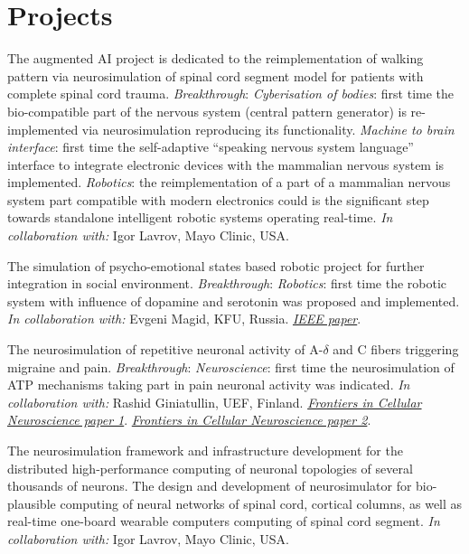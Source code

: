 \documentclass{moderncv}
\begin{document}
\section{Projects}

       {\small The augmented AI project is dedicated to the reimplementation of walking pattern via neurosimulation of spinal cord segment model for patients with complete spinal cord trauma.
  \emph{Breakthrough}:
  \emph{Cyberisation of bodies}: first time the bio-compatible part of the nervous system (central pattern generator) is re-implemented via neurosimulation reproducing its functionality.
  \emph{Machine to brain interface}: first time the self-adaptive ``speaking nervous system language'' interface to integrate electronic devices with the mammalian nervous system is implemented.
  \emph{Robotics}: the reimplementation of a part of a mammalian nervous system part compatible with modern electronics could is the significant step towards standalone intelligent robotic systems operating real-time.
\emph{In collaboration with:} Igor Lavrov, Mayo Clinic, USA.}


       {\small The simulation of psycho-emotional states based robotic project for further integration in social environment.
  \emph{Breakthrough}:
  \emph{Robotics}: first time the robotic system with influence of dopamine and serotonin was proposed and implemented.
  \emph{In collaboration with:} Evgeni Magid, KFU, Russia.
  \href{https://ieeexplore.ieee.org/document/9073255}{\emph{IEEE paper}}.
}
       
       {\small The neurosimulation of repetitive neuronal activity of A-$\delta$ and C fibers triggering migraine and pain.
  \emph{Breakthrough}:
  \emph{Neuroscience}: first time the neurosimulation of ATP mechanisms taking part in pain neuronal activity was indicated.
  \emph{In collaboration with:} Rashid Giniatullin, UEF, Finland.
  \href{https://www.frontiersin.org/articles/10.3389/fncel.2020.00135/full}{\emph{Frontiers in Cellular Neuroscience paper 1}}.
  \href{https://www.frontiersin.org/articles/10.3389/fncel.2021.644047/full}{\emph{Frontiers in Cellular Neuroscience paper 2}}.
}

       {\small The neurosimulation framework and infrastructure development for the distributed high-performance computing of neuronal topologies of several thousands of neurons.
  The design and development of neurosimulator for bio-plausible computing of neural networks of spinal cord, cortical columns, as well as real-time one-board wearable computers computing of spinal cord segment.
  \emph{In collaboration with:} Igor Lavrov, Mayo Clinic, USA.
}
       
\end{document}
